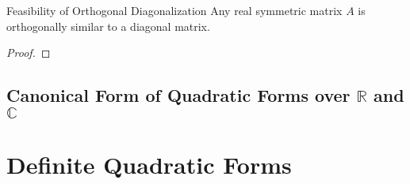 \begin{proposition}{Feasibility of Orthogonal Diagonalization}{}
  Any real symmetric matrix $A$ is orthogonally similar to a diagonal matrix.
\end{proposition}

\begin{proof}
  
\end{proof}

\subsection{Canonical Form of Quadratic Forms over $\mathbb{R}$ and $\mathbb{C}$}


\section{Definite Quadratic Forms}




